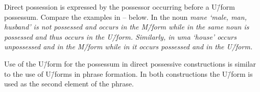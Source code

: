 \begin{exe}\let\eachwordone=\itshape
	\label{ex:MamAliPos1}
	\label{ex:MamAliPos2}
\end{exe}

Direct possession is expressed
by the possessor occurring before a U\=/form possessum.
Compare the examples in -- below.
In  the noun \it{mane} `male, man, husband'
is not possessed and occurs in the M\=/form while
in  the same noun is possessed and
thus occurs in the U\=/form.
Similarly, in  \it{uma} `house'
occurs unpossessed and in the M\=/form
while in  it occurs possessed and in the U\=/form.

\begin{exe}\let\eachwordone=\itshape
	\label{ex:MamPos1a}
	\label{ex:MamPos1b}
	\label{ex:MamPos2a}
	\label{ex:MamPos2b}
\end{exe}

Use of the U\=/form for the possessum in direct
possessive constructions is similar
to the use of U\=/forms in phrase formation.
In both constructions the U\=/form is used as the second element of the phrase.

